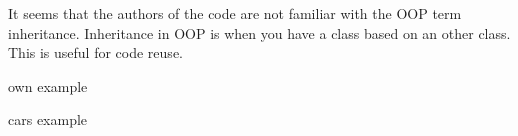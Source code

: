 It seems that the authors of the code are not familiar with the OOP term inheritance.
Inheritance in OOP is when you have a class based on an other class.
This is useful for code reuse.

own example

cars example